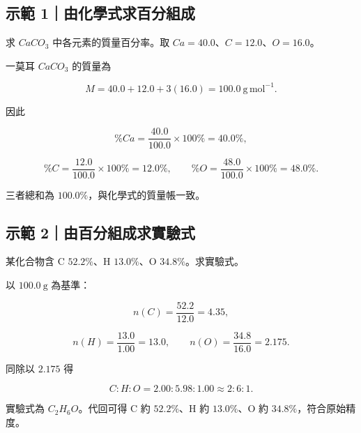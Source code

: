 \documentclass[11pt,a4paper]{article}
\begin{document}
\begin{HandoutWorkedExample}

\subsection{示範 1｜由化學式求百分組成}\label{ux793aux7bc4-1ux7531ux5316ux5b78ux5f0fux6c42ux767eux5206ux7d44ux6210}

求 \(CaCO_3\) 中各元素的質量百分率。取 \(Ca=40.0\)、\(C=12.0\)、\(O=16.0\)。

一莫耳 \(CaCO_3\) 的質量為

\[
M=40.0+12.0+3(16.0)=100.0\ \mathrm{g\,mol^{-1}}.
\]

因此

\[
\%Ca=\frac{40.0}{100.0}\times100\%=40.0\%,
\]

\[
\%C=\frac{12.0}{100.0}\times100\%=12.0\%,\qquad
\%O=\frac{48.0}{100.0}\times100\%=48.0\%.
\]

三者總和為 \(100.0\%\)，與化學式的質量帳一致。

\end{HandoutWorkedExample}

\begin{HandoutWorkedExample}

\subsection{示範 2｜由百分組成求實驗式}\label{ux793aux7bc4-2ux7531ux767eux5206ux7d44ux6210ux6c42ux5be6ux9a57ux5f0f}

某化合物含 C \(52.2\%\)、H \(13.0\%\)、O \(34.8\%\)。求實驗式。

以 \(100.0\ \mathrm g\) 為基準：

\[
n(C)=\frac{52.2}{12.0}=4.35,
\]

\[
n(H)=\frac{13.0}{1.00}=13.0,
\qquad
n(O)=\frac{34.8}{16.0}=2.175.
\]

同除以 \(2.175\) 得

\[
C:H:O=2.00:5.98:1.00\approx2:6:1.
\]

實驗式為 \(C_2H_6O\)。代回可得 C 約 \(52.2\%\)、H 約 \(13.0\%\)、O 約 \(34.8\%\)，符合原始精度。

\end{HandoutWorkedExample}
\end{document}
